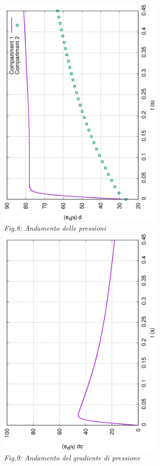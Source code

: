 \documentclass{article}
\begin{document}
        \begin{center}
            \includegraphics[width=0.6\textwidth, angle=-90]{MUL2/p_ES1_0.5.eps}\\ 
            \textit{Fig.8: Andamento delle pressioni} \\ 
            \includegraphics[width=0.6\textwidth, angle=-90]{MUL2/Dp_ES1_0.5.eps}\\
            \textit{Fig.9: Andamento del gradiente di pressione}\\
        \end{center}
        \pagebreak
\end{document}
